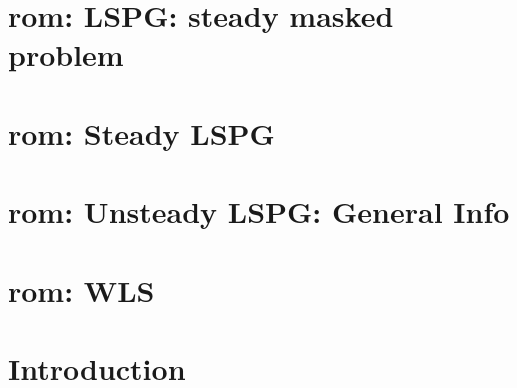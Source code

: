 \let\mypdfximage\pdfximage\def\pdfximage{\immediate\mypdfximage}\documentclass[twoside]{book}
\newcommand{\+}{\discretionary{\mbox{\scriptsize$\hookleftarrow$}}{}{}}
\newcommand{\clearemptydoublepage}{%
  \newpage{\pagestyle{empty}\cleardoublepage}%
}
\begin{document}
\chapter{rom\+: LSPG\+: steady masked problem}
\label{md_pages_components_rom_lspg_masked_steady}

\chapter{rom\+: Steady LSPG}
\label{md_pages_components_rom_lspg_steady}

\chapter{rom\+: Unsteady LSPG\+: General Info}
\label{md_pages_components_rom_lspg_unsteady}

\chapter{rom\+: WLS}
\label{md_pages_components_rom_wls}

\chapter{Introduction}
\label{md_pages_introduction}


\backmatter
\newpage
{}
\clearemptydoublepage
{}
\printindex
\end{document}
